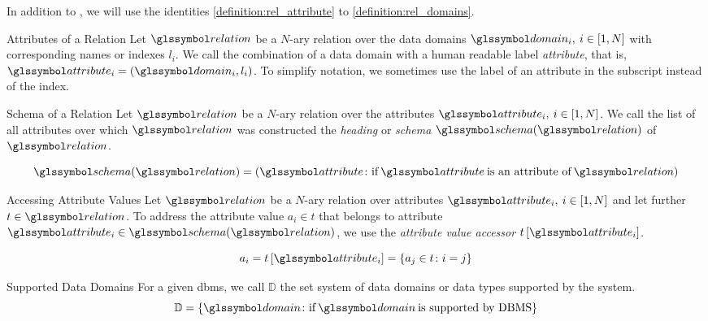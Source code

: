 In addition to , we will use the identities \ref{definition:rel_attribute} to \ref{definition:rel_domains}.

\begin{definition}[label=definition:rel_attribute]{Attributes of a Relation}{}
    Let $\relation$ be a $N$-ary relation over the data domains $\domain_i, \: i \in \left[1, N \right]$ with corresponding names or indexes $l_i$. We call the combination of a data domain with a human readable label \emph{attribute}, that is, $\attribute_{i} = (\domain_i, l_i)$. To simplify notation, we sometimes use the label of an attribute in the subscript instead of the index.
\end{definition}

\begin{definition}[label=definition:rel_schema]{Schema of a Relation}{}
    Let $\relation$ be a $N$-ary relation over the attributes $\attribute_i, \: i \in \left[1, N \right]$. We call the list of all attributes over which $\relation$ was constructed the \emph{heading} or \emph{schema} $\schema (\relation)$ of $\relation$.

    \begin{equation*}
        \schema (\relation) = \left( \attribute \colon \textrm{if} \: \attribute \: \textrm{is an attribute of} \: \relation \right)
    \end{equation*}   
\end{definition}

\begin{definition}[label=definition:rel_attribute_value]{Accessing Attribute Values}{}
    Let $\relation$ be a $N$-ary relation over attributes $\attribute_i, \: i \in \left[1, N \right]$ and let further $t \in \relation$. To address the attribute value $a_i \in t$ that belongs to attribute $\attribute_i \in \schema(\relation) $, we use the \emph{attribute value accessor} $t\left[ \attribute_i \right]$.

    \begin{equation*}
        a_i = t\left[ \attribute_i \right] = \{ a_j \in t \colon i = j \}
    \end{equation*}  
\end{definition}

\begin{definition}[label=definition:rel_domains]{Supported Data Domains}{}
    For a given \acrshort{dbms}, we call $\mathbb{D}$ the set system of data domains or data types supported by the system.
    \begin{equation*}
        \mathbb{D} = \{ \domain \colon \textrm{if} \: \domain \: \textrm{is supported by DBMS} \}
    \end{equation*}
\end{definition}

